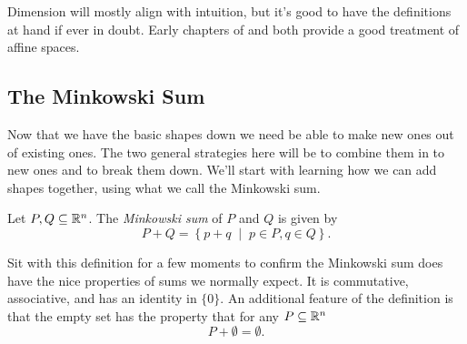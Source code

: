 \documentclass[12pt,oneside]{../../sfsuthesis}
\begin{document}
Dimension will mostly align with intuition, but it's good to have the definitions at hand if ever in doubt.
Early chapters of \cite{zieglerLecturesPolytopes1995} and \cite{grunbaumConvexPolytopes2003} both provide a good treatment of affine spaces.

\subsection{The Minkowski Sum}
Now that we have the basic shapes down we need be able to make new ones out of existing ones.
The two general strategies here will be to combine them in to new ones and to break them down.
We'll start with learning how we can add shapes together, using what we call the Minkowski sum.
\begin{definition}\th\label{def:MinkowskiSum}
    Let \( P, Q \subseteq \mathbb{R}^n \).
    The \emph{Minkowski sum} of \( P \) and \( Q \) is given by
    \[
        P + Q = \left\{ p + q \; \middle| \; p \in P, q \in Q \right\}.
    \]
\end{definition}
Sit with this definition for a few moments to confirm the Minkowski sum does have the nice properties of sums we normally expect.
It is commutative, associative, and has an identity in \( \{ 0 \} \).
An additional feature of the definition is that the empty set has the property that for any \( P \subseteq \mathbb{R}^n \)
\[
    P + \emptyset = \emptyset.
\]
\end{document}
